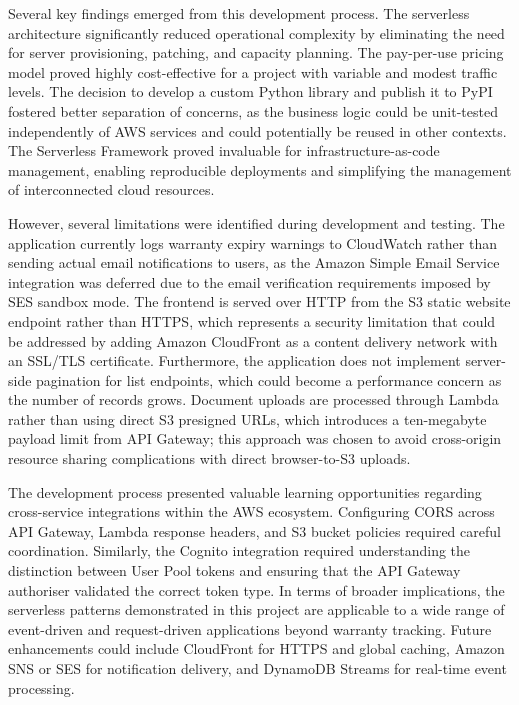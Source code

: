 \documentclass[conference]{IEEEtran}
\begin{document}
Several key findings emerged from this development process. The serverless architecture significantly reduced operational complexity by eliminating the need for server provisioning, patching, and capacity planning. The pay-per-use pricing model proved highly cost-effective for a project with variable and modest traffic levels. The decision to develop a custom Python library and publish it to PyPI fostered better separation of concerns, as the business logic could be unit-tested independently of AWS services and could potentially be reused in other contexts. The Serverless Framework proved invaluable for infrastructure-as-code management, enabling reproducible deployments and simplifying the management of interconnected cloud resources.

However, several limitations were identified during development and testing. The application currently logs warranty expiry warnings to CloudWatch rather than sending actual email notifications to users, as the Amazon Simple Email Service integration was deferred due to the email verification requirements imposed by SES sandbox mode. The frontend is served over HTTP from the S3 static website endpoint rather than HTTPS, which represents a security limitation that could be addressed by adding Amazon CloudFront as a content delivery network with an SSL/TLS certificate. Furthermore, the application does not implement server-side pagination for list endpoints, which could become a performance concern as the number of records grows. Document uploads are processed through Lambda rather than using direct S3 presigned URLs, which introduces a ten-megabyte payload limit from API Gateway; this approach was chosen to avoid cross-origin resource sharing complications with direct browser-to-S3 uploads.

The development process presented valuable learning opportunities regarding cross-service integrations within the AWS ecosystem. Configuring CORS across API Gateway, Lambda response headers, and S3 bucket policies required careful coordination. Similarly, the Cognito integration required understanding the distinction between User Pool tokens and ensuring that the API Gateway authoriser validated the correct token type. In terms of broader implications, the serverless patterns demonstrated in this project are applicable to a wide range of event-driven and request-driven applications beyond warranty tracking. Future enhancements could include CloudFront for HTTPS and global caching, Amazon SNS or SES for notification delivery, and DynamoDB Streams for real-time event processing.
\end{document}
